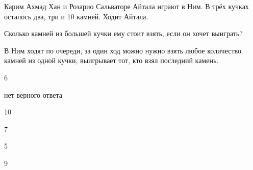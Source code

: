
\begin{question}
Карим Ахмад Хан и Розарио Сальваторе Айтала играют в Ним.
В трёх кучках осталось два, три и 10 камней. Ходит Айтала.

Сколько камней из большей кучки ему стоит взять, если он хочет выиграть?

В Ним ходят по очереди, за один ход можно нужно взять любое количество камней из одной кучки, выигрывает тот, кто взял последний камень.
\begin{answerlist}
  \item 6
  \item нет верного ответа
  \item 10
  \item 7
  \item 5
  \item 9
\end{answerlist}
\end{question}



